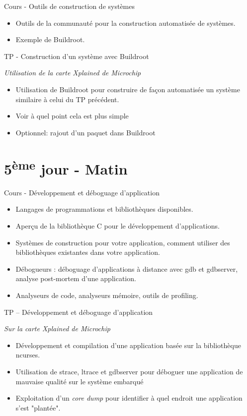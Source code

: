 \documentclass[a4paper,12pt,obeyspaces,spaces,hyphens]{article}
\begin{document}
\feagendatwocolumn
{Cours - Outils de construction de systèmes}
{
  \begin{itemize}
  \item Outils de la communauté pour la construction
	automatisée de systèmes.
  \item Exemple de Buildroot.
  \end{itemize}
}
{TP - Construction d'un système avec Buildroot}
{
  {\em Utilisation de la carte Xplained de Microchip}
  \begin{itemize}
  \item Utilisation de Buildroot pour construire de façon automatisée
	un système similaire à celui du TP précédent.
  \item Voir à quel point cela est plus simple
  \item Optionnel: rajout d'un paquet dans Buildroot
  \end{itemize}
}

\section{5\textsuperscript{ème} jour - Matin}

\feagendaonecolumn
{Cours - Développement et déboguage d'application}
{
  \begin{itemize}
  \item Langages de programmations et bibliothèques disponibles.
  \item Aperçu de la bibliothèque C pour le développement d'applications.
  \item Systèmes de construction pour votre application, comment utiliser des
	bibliothèques existantes dans votre application.
  \item Débogueurs : déboguage d'applications à distance avec gdb et gdbserver, analyse
	post-mortem d'une application.
  \item Analyseurs de code, analyseurs mémoire, outils de profiling.
  \end{itemize}
}

\feagendaonecolumn
{TP – Développement et déboguage d'application}
{
  {\em Sur la carte Xplained de Microchip}
  \begin{itemize}
  \item Développement et compilation d'une application basée sur la bibliothèque
	ncurses.
  \item Utilisation de strace, ltrace et gdbserver pour déboguer une application de
	mauvaise qualité sur le système embarqué
  \item Exploitation d'un {\em core dump} pour identifier à quel endroit
        une application s'est "plantée".
  \end{itemize}
}
\end{document}
